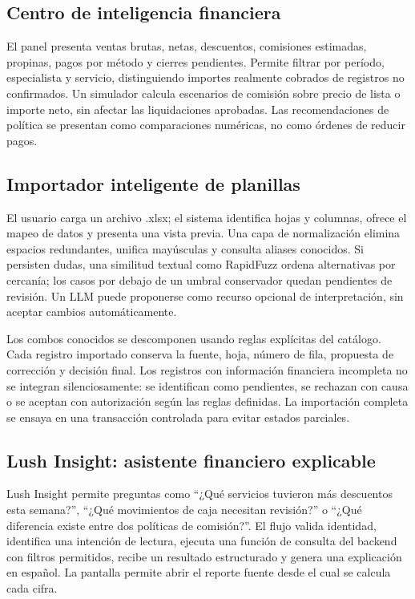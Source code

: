 \subsection{Centro de inteligencia financiera}

El panel presenta ventas brutas, netas, descuentos, comisiones estimadas, propinas, pagos por método y cierres pendientes. Permite filtrar por período, especialista y servicio, distinguiendo importes realmente cobrados de registros no confirmados. Un simulador calcula escenarios de comisión sobre precio de lista o importe neto, sin afectar las liquidaciones aprobadas. Las recomendaciones de política se presentan como comparaciones numéricas, no como órdenes de reducir pagos.


\subsection{Importador inteligente de planillas}

El usuario carga un archivo .xlsx; el sistema identifica hojas y columnas, ofrece el mapeo de datos y presenta una vista previa. Una capa de normalización elimina espacios redundantes, unifica mayúsculas y consulta aliases conocidos. Si persisten dudas, una similitud textual como RapidFuzz ordena alternativas por cercanía; los casos por debajo de un umbral conservador quedan pendientes de revisión. Un LLM puede proponerse como recurso opcional de interpretación, sin aceptar cambios automáticamente.


Los combos conocidos se descomponen usando reglas explícitas del catálogo. Cada registro importado conserva la fuente, hoja, número de fila, propuesta de corrección y decisión final. Los registros con información financiera incompleta no se integran silenciosamente: se identifican como pendientes, se rechazan con causa o se aceptan con autorización según las reglas definidas. La importación completa se ensaya en una transacción controlada para evitar estados parciales.


\subsection{Lush Insight: asistente financiero explicable}

Lush Insight permite preguntas como “¿Qué servicios tuvieron más descuentos esta semana?”, “¿Qué movimientos de caja necesitan revisión?” o “¿Qué diferencia existe entre dos políticas de comisión?”. El flujo valida identidad, identifica una intención de lectura, ejecuta una función de consulta del backend con filtros permitidos, recibe un resultado estructurado y genera una explicación en español. La pantalla permite abrir el reporte fuente desde el cual se calcula cada cifra.


